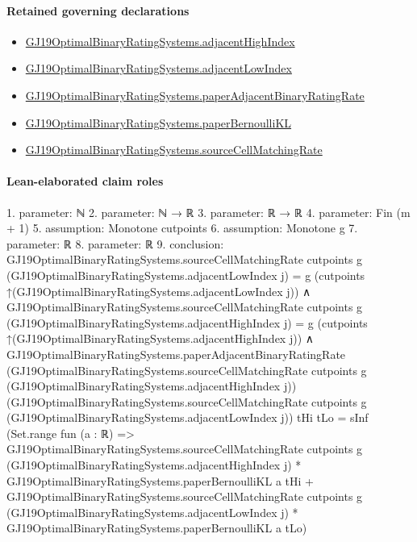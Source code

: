 \documentclass[10pt]{article}
\begin{document}
\paragraph{Retained governing declarations}
\begin{itemize}\raggedright
\item \hyperlink{governing-declaration-28fccf34ba067e47}{GJ19\allowbreak{}Optimal\allowbreak{}Binary\allowbreak{}Rating\allowbreak{}Systems.\allowbreak{}adjacent\allowbreak{}High\allowbreak{}Index}
\item \hyperlink{governing-declaration-6d6631db7a243715}{GJ19\allowbreak{}Optimal\allowbreak{}Binary\allowbreak{}Rating\allowbreak{}Systems.\allowbreak{}adjacent\allowbreak{}Low\allowbreak{}Index}
\item \hyperlink{governing-declaration-aedffdf1beb2bd17}{GJ19\allowbreak{}Optimal\allowbreak{}Binary\allowbreak{}Rating\allowbreak{}Systems.\allowbreak{}paper\allowbreak{}Adjacent\allowbreak{}Binary\allowbreak{}Rating\allowbreak{}Rate}
\item \hyperlink{governing-declaration-1f361b6c7feed197}{GJ19\allowbreak{}Optimal\allowbreak{}Binary\allowbreak{}Rating\allowbreak{}Systems.\allowbreak{}paper\allowbreak{}Bernoulli\allowbreak{}KL}
\item \hyperlink{governing-declaration-3685ee104d8de603}{GJ19\allowbreak{}Optimal\allowbreak{}Binary\allowbreak{}Rating\allowbreak{}Systems.\allowbreak{}source\allowbreak{}Cell\allowbreak{}Matching\allowbreak{}Rate}
\end{itemize}
\paragraph{Lean-elaborated claim roles}\begin{ReviewVerbatim}
1. parameter: ℕ
2. parameter: ℕ → ℝ
3. parameter: ℝ → ℝ
4. parameter: Fin (m + 1)
5. assumption: Monotone cutpoints
6. assumption: Monotone g
7. parameter: ℝ
8. parameter: ℝ
9. conclusion: GJ19OptimalBinaryRatingSystems.sourceCellMatchingRate cutpoints g (GJ19OptimalBinaryRatingSystems.adjacentLowIndex j) =
    g (cutpoints ↑(GJ19OptimalBinaryRatingSystems.adjacentLowIndex j)) ∧
  GJ19OptimalBinaryRatingSystems.sourceCellMatchingRate cutpoints g
        (GJ19OptimalBinaryRatingSystems.adjacentHighIndex j) =
      g (cutpoints ↑(GJ19OptimalBinaryRatingSystems.adjacentHighIndex j)) ∧
    GJ19OptimalBinaryRatingSystems.paperAdjacentBinaryRatingRate
        (GJ19OptimalBinaryRatingSystems.sourceCellMatchingRate cutpoints g
          (GJ19OptimalBinaryRatingSystems.adjacentHighIndex j))
        (GJ19OptimalBinaryRatingSystems.sourceCellMatchingRate cutpoints g
          (GJ19OptimalBinaryRatingSystems.adjacentLowIndex j))
        tHi tLo =
      sInf
        (Set.range fun (a : ℝ) =>
          GJ19OptimalBinaryRatingSystems.sourceCellMatchingRate cutpoints g
                (GJ19OptimalBinaryRatingSystems.adjacentHighIndex j) *
              GJ19OptimalBinaryRatingSystems.paperBernoulliKL a tHi +
            GJ19OptimalBinaryRatingSystems.sourceCellMatchingRate cutpoints g
                (GJ19OptimalBinaryRatingSystems.adjacentLowIndex j) *
              GJ19OptimalBinaryRatingSystems.paperBernoulliKL a tLo)
\end{ReviewVerbatim}
\end{document}
